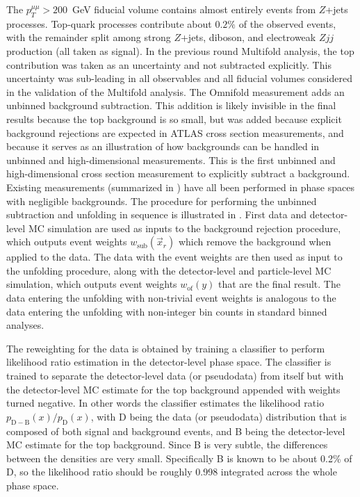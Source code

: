 The $p_T^{\mu\mu} > 200$~GeV fiducial volume contains almost entirely events from $Z$+jets processes.
Top-quark processes contribute about $0.2\%$ of the observed events, with the remainder split among strong $Z$+jets, diboson, and electroweak $Zjj$ production (all taken as signal).
In the previous round Multifold analysis, the top contribution was taken as an uncertainty and not subtracted explicitly.
This uncertainty was sub-leading in all observables and all fiducial volumes considered in the validation of the Multifold analysis.
The Omnifold measurement adds an unbinned background subtraction.
This addition is likely invisible in the final results because the top background is so small, but was added because explicit background rejections are expected in ATLAS cross section measurements, and because it serves as an illustration of how backgrounds can be handled in unbinned and high-dimensional measurements.
This is the first unbinned and high-dimensional cross section measurement to explicitly subtract a background.
Existing measurements (summarized in ) have all been performed in phase spaces with negligible backgrounds.
The procedure for performing the unbinned subtraction and unfolding in sequence is illustrated in .
First data and detector-level MC simulation are used as inputs to the background rejection procedure, which outputs event weights $w_{\textrm{sub}}(\vec{x}_r)$ which remove the background when applied to the data.
The data with the event weights are then used as input to the unfolding procedure, along with the detector-level and particle-level MC simulation, which outputs event weights $w_{\textrm{of}}(y)$ that are the final result.
The data entering the unfolding with non-trivial event weights is analogous to the data entering the unfolding with non-integer bin counts in standard binned analyses.

The reweighting for the data is obtained by training a classifier to perform likelihood ratio estimation in the detector-level phase space.
The classifier is trained to separate the detector-level data (or pseudodata) from itself but with the detector-level MC estimate for the top background appended with weights turned negative.
In other words the classifier estimates the likelihood ratio $p_{\mathrm{D-B}}(x) / p_{\mathrm{D}}(x)$, with D being the data (or pseudodata) distribution that is composed of both signal and background events, and B being the detector-level MC estimate for the top background.
Since B is very subtle, the differences between the densities are very small.
Specifically B is known to be about 0.2\% of D, so the likelihood ratio should be roughly 0.998 integrated across the whole phase space.

